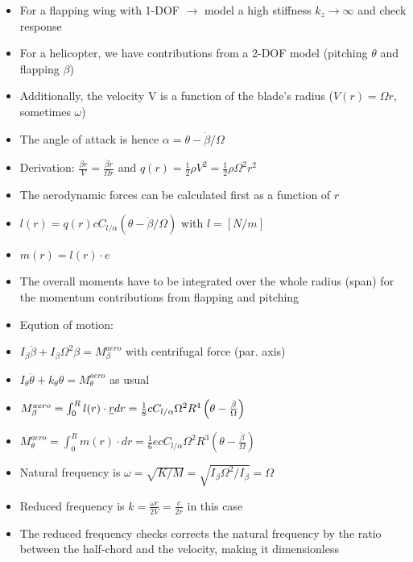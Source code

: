 \documentclass[8pt, landscape, fleqn]{scrartcl}
\begin{document}
\begin{multicols*}{3}
\begin{itemize}
    \item For a flapping wing with 1-DOF $\rightarrow$ model a high stiffness $k_z \rightarrow \infty$ and check response
    \item For a helicopter, we have contributions from a 2-DOF model (pitching $\theta$ and flapping $\beta$)
    \item Additionally, the velocity V is a function of the blade's radius ($V(r) = \Omega r$, sometimes $\omega$)
    \item The angle of attack is hence $\alpha = \theta - \dot{\beta} / \Omega $
    \item Derivation: $\frac{\dot{\beta}r}{V} = \frac{\dot{\beta} r}{\Omega r}$ and $q(r) = \frac{1}{2}\rho V^2 = \frac{1}{2} \rho \Omega^2 r^2$
    \item The aerodynamic forces can be calculated first as a function of $r$
    \item $l(r) = q(r) c C_{l/\alpha} \left( \theta - \dot{\beta}/\Omega \right)$ with $l = [N/m]$
    \item $m(r) = l(r) \cdot e $
    \item The overall moments have to be integrated over the whole radius (span) for the momentum contributions from flapping and pitching
    \item Eqution of motion:
    \item $I_\beta \ddot{\beta} + I_\beta \Omega^2 \beta = M_{\beta}^{aero}$ with centrifugal force (par. axis)
    \item $I_\theta \ddot{\theta} + k_\theta \theta = M_{\theta}^{aero}$ as usual
    \item $M_{\beta}^{aero} = \int_0^R l(r) \cdot \emph{r} dr = \frac{1}{8} c C_{l/\alpha} \Omega^2 R^4 \left( \theta - \frac{\dot{\beta}}{\Omega} \right)$
    \item $M_{\theta}^{aero} = \int_0^R m(r) \cdot dr = \frac{1}{6} ec C_{l/\alpha} \Omega^2 R^3 \left( \theta - \frac{\dot{\beta}}{\Omega} \right)$ 
    \item Natural frequency is $\omega = \sqrt{K/M} = \sqrt{I_\beta\Omega^2/I_\beta} = \Omega$
    \item Reduced frequency is $ k = \frac{\omega c}{2 V} = \frac{c}{2r}$ in this case
    \item The reduced frequency checks corrects the natural frequency by the ratio between the half-chord and the velocity, making it dimensionless
\end{itemize}


\end{multicols*}
\end{document}

